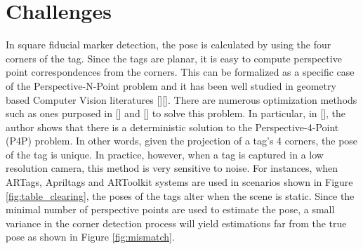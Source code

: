 \section{Challenges}
\label{sec:problem}
In square fiducial marker detection, the pose is calculated by using the four corners of the tag. Since the tags are planar, it is easy to compute perspective point correspondences from the corners. This can be formalized as a specific case of the Perspective-N-Point problem and it has been well studied in geometry based Computer Vision literatures [][]. There are numerous optimization methods such as ones purposed in [] and [] to solve this problem. In particular, in [], the author shows that there is a deterministic solution to the Perspective-4-Point (P4P) problem. In other words, given the projection of a tag's 4 corners, the pose of the tag is unique. In practice, however, when a tag is captured in a low resolution camera, this method is very sensitive to noise. For instances, when ARTags, Apriltags and ARToolkit systems are used in scenarios shown in Figure \ref{fig:table_clearing}, the poses of the tags alter when the scene is static. Since the minimal number of perspective points are used to estimate the pose, a small variance in the corner detection process will yield estimations far from the true pose as shown in Figure \ref{fig:mismatch}.


